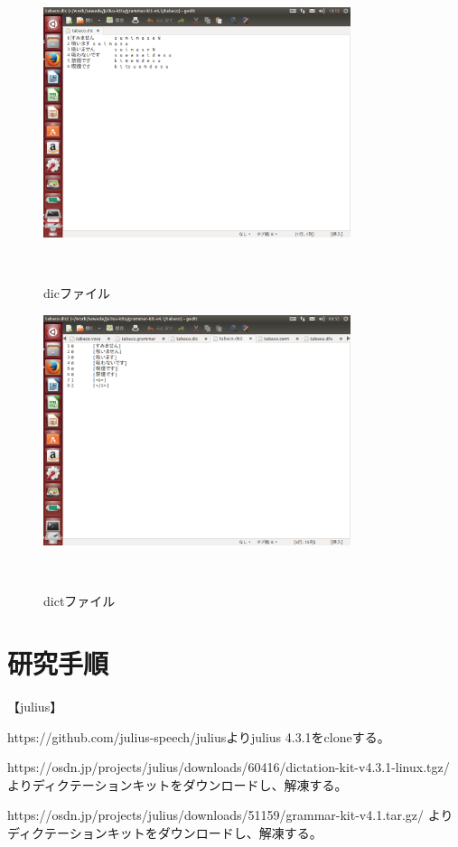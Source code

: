\documentclass[11pt]{jsarticle}
\begin{document}
\begin{figure}[b]
 \begin{center}
  \includegraphics[width=90mm]{dic.png}
 　\caption{dicファイル}
 　\label{fig:kinshi}
 \end{center}
\end{figure}

\begin{figure}[b]
 \begin{center}
  \includegraphics[width=90mm]{dict.png}
 　\caption{dictファイル}
 　\label{fig:kinshi}
 \end{center}
\end{figure}

\section{研究手順}
【julius】


https://github.com/julius-speech/juliusよりjulius 4.3.1をcloneする。


https://osdn.jp/projects/julius/downloads/60416/dictation-kit-v4.3.1-linux.tgz/ よりディクテーションキットをダウンロードし、解凍する。


https://osdn.jp/projects/julius/downloads/51159/grammar-kit-v4.1.tar.gz/ よりディクテーションキットをダウンロードし、解凍する。
\end{document}
